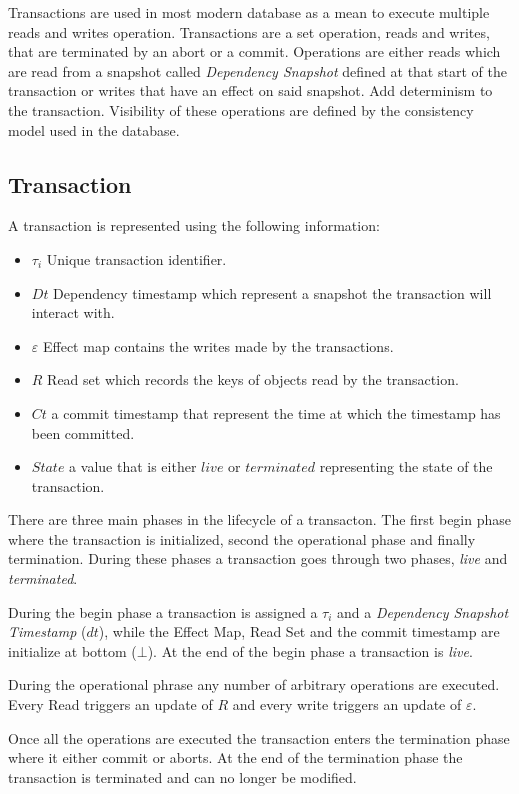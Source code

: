 \documentclass[parallelisme]{compas2022}
\begin{document}
Transactions are used in most modern database as a mean to execute multiple reads and writes operation.
Transactions are a set operation, reads and writes, that are terminated by an abort or a commit.
Operations are either reads which are read from a snapshot called \emph{Dependency Snapshot} defined at that start of the transaction or writes that have an effect on said snapshot. Add determinism to the transaction.
Visibility of these operations are defined by the consistency model used in the database.


\subsection{Transaction}

A transaction is represented using the following information:
\begin{itemize}
\item $\tau_i$ Unique transaction identifier.
\item $Dt$ Dependency timestamp which represent a snapshot the transaction will interact with.
\item $\varepsilon$ Effect map contains the writes made by the transactions.
\item $R$ Read set which records the keys of objects read by the transaction.
\item $Ct$ a commit timestamp that represent the time at which the timestamp has been committed.
\item $State$ a value that is either $live$ or $terminated$ representing the state of the transaction.
\end{itemize}

There are three main phases in the lifecycle of a transacton.
The first begin phase where the transaction is initialized, second the operational phase and finally termination.
During these phases a transaction goes through two phases, \emph{live} and \emph{terminated}.

During the begin phase a transaction is assigned a $\tau_i$ and a \emph{Dependency Snapshot Timestamp} ($dt$), while the Effect Map, Read Set and the commit timestamp are initialize at bottom ($\bot$).
At the end of the begin phase a transaction is \emph{live}.

During the operational phrase any number of arbitrary operations are executed.
Every Read triggers an update of $R$ and every write triggers an update of $\varepsilon$.

Once all the operations are executed the transaction enters the termination phase where it either commit or aborts. At the end of the termination phase the transaction is terminated and can no longer be modified.
\end{document}
